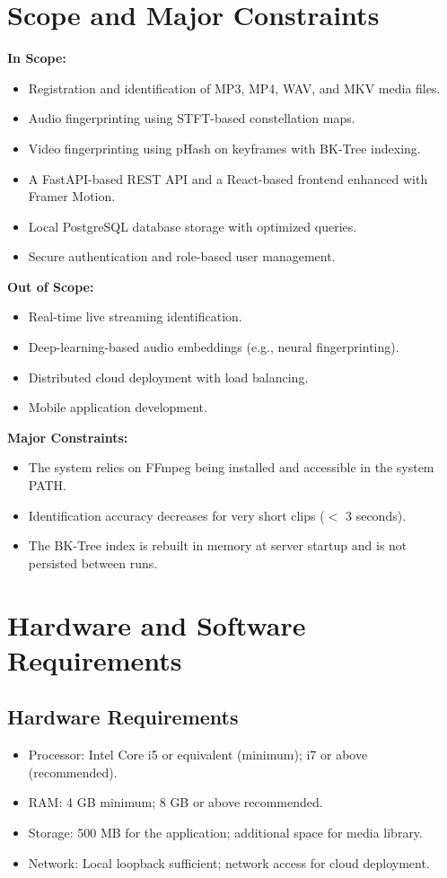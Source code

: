 \section{Scope and Major Constraints}
\textbf{In Scope:}
\begin{itemize}
  \item Registration and identification of MP3, MP4, WAV, and MKV media files.
  \item Audio fingerprinting using STFT-based constellation maps.
  \item Video fingerprinting using pHash on keyframes with BK-Tree indexing.
  \item A FastAPI-based REST API and a React-based frontend enhanced with Framer Motion.
  \item Local PostgreSQL database storage with optimized queries.
  \item Secure authentication and role-based user management.
\end{itemize}

\textbf{Out of Scope:}
\begin{itemize}
  \item Real-time live streaming identification.
  \item Deep-learning-based audio embeddings (e.g., neural fingerprinting).
  \item Distributed cloud deployment with load balancing.
  \item Mobile application development.
\end{itemize}

\textbf{Major Constraints:}
\begin{itemize}
  \item The system relies on FFmpeg being installed and accessible in the system PATH.
  \item Identification accuracy decreases for very short clips ($<$ 3 seconds).
  \item The BK-Tree index is rebuilt in memory at server startup and is not persisted between runs.
\end{itemize}

\section{Hardware and Software Requirements}

\subsection*{Hardware Requirements}
\begin{itemize}
  \item Processor: Intel Core i5 or equivalent (minimum); i7 or above (recommended).
  \item RAM: 4 GB minimum; 8 GB or above recommended.
  \item Storage: 500 MB for the application; additional space for media library.
  \item Network: Local loopback sufficient; network access for cloud deployment.
\end{itemize}

